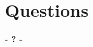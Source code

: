 \documentclass{beamer}
\begin{document}
%
%
\section{Questions}
\begin{frame}
	\titlepage
	\begin{center}
		\Huge\bfseries
		- ? -
	\end{center}
\end{frame}
\end{document}
